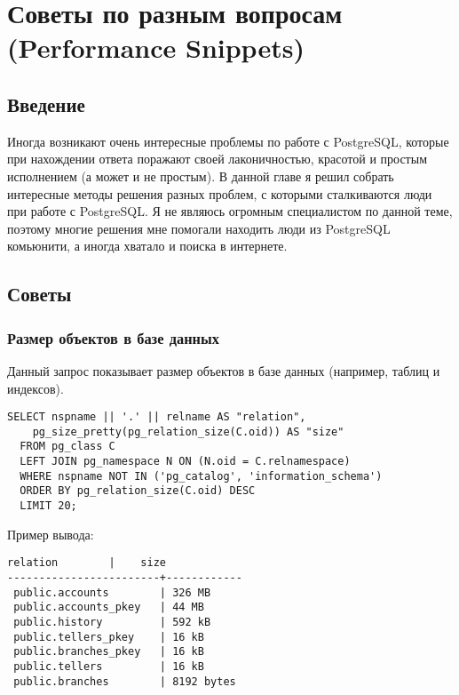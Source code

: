 \chapter{Советы по разным вопросам (Performance Snippets)}
\begin{epigraphs}
\end{epigraphs}

\section{Введение}
Иногда возникают очень интересные проблемы по работе с PostgreSQL, которые при нахождении ответа поражают своей лаконичностью, 
красотой и простым исполнением (а может и не простым). В данной главе я решил собрать интересные методы решения разных проблем, с 
которыми сталкиваются люди при работе с PostgreSQL. Я не являюсь огромным специалистом по данной теме, поэтому многие решения 
мне помогали находить люди из PostgreSQL комьюнити, а иногда хватало и поиска в интернете. 

\section{Советы}

\subsection{Размер объектов в базе данных}
Данный запрос показывает размер объектов в базе данных (например, таблиц и индексов).

\begin{lstlisting}[label=lst:snippets1,title=snippets/biggest\_relations.sql]
SELECT nspname || '.' || relname AS "relation",
    pg_size_pretty(pg_relation_size(C.oid)) AS "size"
  FROM pg_class C
  LEFT JOIN pg_namespace N ON (N.oid = C.relnamespace)
  WHERE nspname NOT IN ('pg_catalog', 'information_schema')
  ORDER BY pg_relation_size(C.oid) DESC
  LIMIT 20;
\end{lstlisting}

Пример вывода:
\begin{lstlisting}[label=lst:snippets2,caption=Поиск самых больших объектов в БД. Пример вывода]
        relation        |    size    
------------------------+------------
 public.accounts        | 326 MB
 public.accounts_pkey   | 44 MB
 public.history         | 592 kB
 public.tellers_pkey    | 16 kB
 public.branches_pkey   | 16 kB
 public.tellers         | 16 kB
 public.branches        | 8192 bytes
\end{lstlisting}

